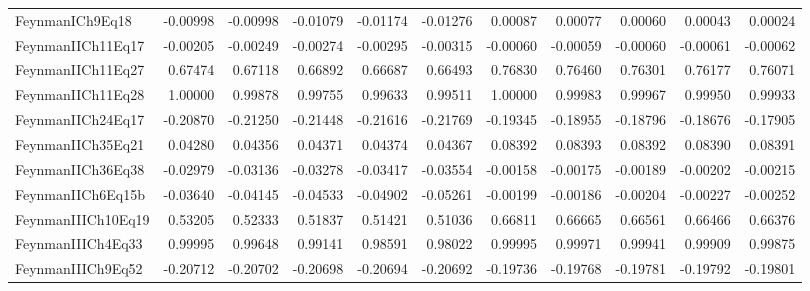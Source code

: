 \begin{tabular}{lrrrrrrrrrr}
FeynmanICh9Eq18 & -0.00998 & -0.00998 & -0.01079 & -0.01174 & -0.01276 & 0.00087 & 0.00077 & 0.00060 & 0.00043 & 0.00024 \\
FeynmanIICh11Eq17 & -0.00205 & -0.00249 & -0.00274 & -0.00295 & -0.00315 & -0.00060 & -0.00059 & -0.00060 & -0.00061 & -0.00062 \\
FeynmanIICh11Eq27 & 0.67474 & 0.67118 & 0.66892 & 0.66687 & 0.66493 & 0.76830 & 0.76460 & 0.76301 & 0.76177 & 0.76071 \\
FeynmanIICh11Eq28 & 1.00000 & 0.99878 & 0.99755 & 0.99633 & 0.99511 & 1.00000 & 0.99983 & 0.99967 & 0.99950 & 0.99933 \\
FeynmanIICh24Eq17 & -0.20870 & -0.21250 & -0.21448 & -0.21616 & -0.21769 & -0.19345 & -0.18955 & -0.18796 & -0.18676 & -0.17905 \\
FeynmanIICh35Eq21 & 0.04280 & 0.04356 & 0.04371 & 0.04374 & 0.04367 & 0.08392 & 0.08393 & 0.08392 & 0.08390 & 0.08391 \\
FeynmanIICh36Eq38 & -0.02979 & -0.03136 & -0.03278 & -0.03417 & -0.03554 & -0.00158 & -0.00175 & -0.00189 & -0.00202 & -0.00215 \\
FeynmanIICh6Eq15b & -0.03640 & -0.04145 & -0.04533 & -0.04902 & -0.05261 & -0.00199 & -0.00186 & -0.00204 & -0.00227 & -0.00252 \\
FeynmanIIICh10Eq19 & 0.53205 & 0.52333 & 0.51837 & 0.51421 & 0.51036 & 0.66811 & 0.66665 & 0.66561 & 0.66466 & 0.66376 \\
FeynmanIIICh4Eq33 & 0.99995 & 0.99648 & 0.99141 & 0.98591 & 0.98022 & 0.99995 & 0.99971 & 0.99941 & 0.99909 & 0.99875 \\
FeynmanIIICh9Eq52 & -0.20712 & -0.20702 & -0.20698 & -0.20694 & -0.20692 & -0.19736 & -0.19768 & -0.19781 & -0.19792 & -0.19801 \\
\bottomrule
\end{tabular}

